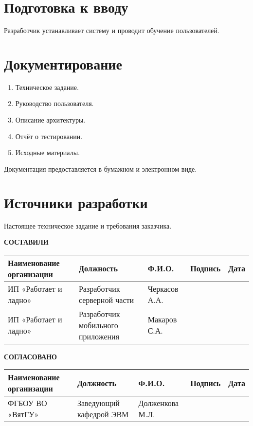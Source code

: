 \documentclass[oneside,a4paper,14pt]{extarticle}
\begin{document}
\section{Подготовка к вводу}
Разработчик устанавливает систему и проводит обучение пользователей.

\section{Документирование}
\begin{enumerate}
    \item Техническое задание.
    \item Руководство пользователя.
    \item Описание архитектуры.
    \item Отчёт о тестировании.
    \item Исходные материалы.
\end{enumerate}

Документация предоставляется в бумажном и электронном виде.

\section{Источники разработки}
Настоящее техническое задание и требования заказчика.

\newpage
\begin{sidewaystable}
    \centering
    \textbf{СОСТАВИЛИ} \\[3mm]
    \begin{tabular}{|p{60mm}|p{50mm}|p{50mm}|p{25mm}|p{25mm}|}
        \hline
        Наименование организации & Должность                         & Ф.И.О.        & Подпись & Дата \\
        \hline
        ИП «Работает и ладно»    & Разработчик серверной части       & Черкасов А.А. &         &      \\
        \hline
        ИП «Работает и ладно»    & Разработчик мобильного приложения & Макаров С.А.  &         &      \\
        \hline
    \end{tabular}

    \vspace{20mm}

    \textbf{СОГЛАСОВАНО} \\[3mm]
    \begin{tabular}{|p{60mm}|p{50mm}|p{50mm}|p{25mm}|p{25mm}|}
        \hline
        Наименование организации & Должность               & Ф.И.О.          & Подпись & Дата \\
        \hline
        ФГБОУ ВО «ВятГУ»         & Заведующий кафедрой ЭВМ & Долженкова М.Л. &         &      \\
        \hline
    \end{tabular}
\end{sidewaystable}
\end{document}

